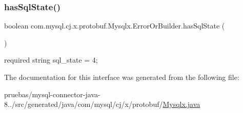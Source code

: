 \subsubsection{\texorpdfstring{has\+Sql\+State()}{hasSqlState()}}
{\footnotesize\ttfamily boolean com.\+mysql.\+cj.\+x.\+protobuf.\+Mysqlx.\+Error\+Or\+Builder.\+has\+Sql\+State (\begin{DoxyParamCaption}{ }\end{DoxyParamCaption})}

{\ttfamily required string sql\+\_\+state = 4;} 

The documentation for this interface was generated from the following file\+:\begin{DoxyCompactItemize}
\item 
pruebas/mysql-\/connector-\/java-\/8../src/generated/java/com/mysql/cj/x/protobuf/\mbox{\hyperlink{_mysqlx_8java}{Mysqlx.\+java}}\end{DoxyCompactItemize}
